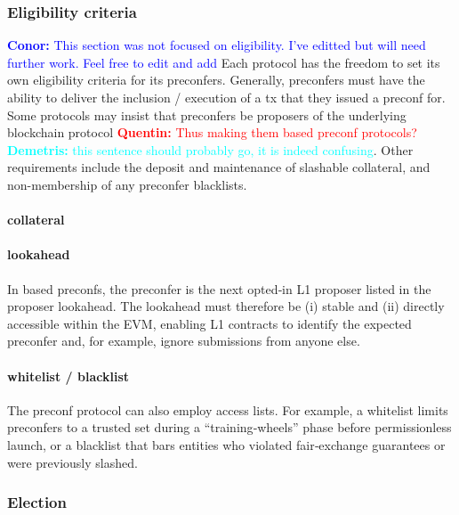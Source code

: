 \documentclass[a4paper]{article}
\theoremstyle{boldstyle}
\newcommand{\cm}[1]{\textcolor{blue}{\textbf{Conor:} #1}}
\newcommand{\qb}[1]{\textcolor{red}{\textbf{Quentin:} #1}}
\newcommand{\dk}[1]{\textcolor{cyan}{\textbf{Demetris:} #1}}
\begin{document}
        \subsubsection{Eligibility criteria}
        \cm{This section was not focused on eligibility. I've editted but will need further work. Feel free to edit and add} 
        Each protocol has the freedom to set its own eligibility criteria for its preconfers. Generally, preconfers must have the ability to deliver the inclusion / execution of a tx that they issued a preconf for. Some protocols may insist that preconfers be proposers of the underlying blockchain protocol \qb{Thus making them based preconf protocols?}\dk{this sentence should probably go, it is indeed confusing}. Other requirements include the deposit and maintenance of slashable collateral, and non-membership of any preconfer blacklists. 
        \paragraph{collateral}
        \paragraph{lookahead}
        \label{sec:step2_lookahead}

In based preconfs, the preconfer is the next opted‑in L1 proposer listed in the proposer lookahead. The lookahead must therefore be (i) stable and (ii) directly accessible within the EVM, enabling L1 contracts to identify the expected preconfer and, for example, ignore submissions from anyone else.

        \paragraph{whitelist / blacklist}

The preconf protocol can also employ access lists. For example, a whitelist limits preconfers to a trusted set during a “training‑wheels” phase before permissionless launch, or a blacklist that bars entities who violated fair‑exchange guarantees or were previously slashed.

        \subsubsection{Election}
        
\end{document}
